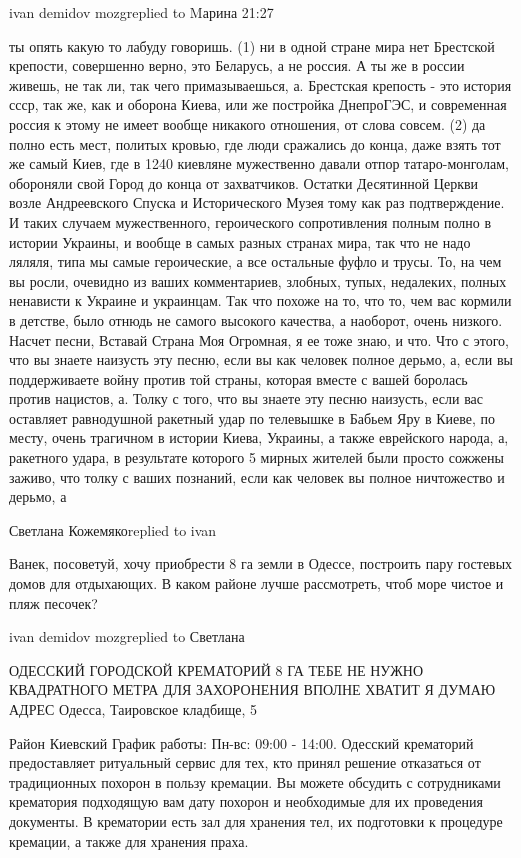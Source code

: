 ivan demidov mozgreplied to Mарина
21:27

ты опять какую то лабуду говоришь. (1) ни в одной стране мира нет Брестской
крепости, совершенно верно, это Беларусь, а не россия. А ты же в россии живешь,
не так ли, так чего примазываешься, а. Брестская крепость - это история ссср,
так же, как и оборона Киева, или же постройка ДнепроГЭС, и современная россия к
этому не имеет вообще никакого отношения, от слова совсем. (2) да полно есть
мест, политых кровью, где люди сражались до конца, даже взять тот же самый
Киев, где в 1240 киевляне мужественно давали отпор татаро-монголам, обороняли
свой Город до конца от захватчиков. Остатки Десятинной Церкви возле
Андреевского Спуска и Исторического Музея тому как раз подтверждение. И таких
случаем мужественного, героического сопротивления полным полно в истории
Украины, и вообще в самых разных странах мира, так что не надо ляляля, типа мы
самые героические, а все остальные фуфло и трусы. То, на чем вы росли, очевидно
из ваших комментариев, злобных, тупых, недалеких, полных ненависти к Украине и
украинцам. Так что похоже на то, что то, чем вас кормили в детстве, было отнюдь
не самого высокого качества, а наоборот, очень низкого. Насчет песни, Вставай
Страна Моя Огромная, я ее тоже знаю, и что. Что с этого, что вы знаете наизусть
эту песню, если вы как человек полное дерьмо, а, если вы поддерживаете войну
против той страны, которая вместе с вашей боролась против нацистов, а. Толку с
того, что вы знаете эту песню наизусть, если вас оставляет равнодушной ракетный
удар по телевышке в Бабьем Яру в Киеве, по месту, очень трагичном в истории
Киева, Украины, а также еврейского народа, а, ракетного удара, в результате
которого 5 мирных жителей были просто сожжены заживо, что толку с ваших
познаний, если как человек вы полное ничтожество и дерьмо, а

Светлана Кожемякоreplied to ivan

Ванек, посоветуй, хочу приобрести 8 га земли в Одессе, построить пару гостевых
домов для отдыхающих. В каком районе лучше рассмотреть, чтоб море чистое и пляж
песочек?

ivan demidov mozgreplied to Светлана

ОДЕССКИЙ ГОРОДСКОЙ КРЕМАТОРИЙ 8 ГА ТЕБЕ НЕ НУЖНО КВАДРАТНОГО МЕТРА ДЛЯ
ЗАХОРОНЕНИЯ ВПОЛНЕ ХВАТИТ Я ДУМАЮ АДРЕС Одесса, Таировское кладбище, 5

Район Киевский	График работы: Пн-вс: 
09:00 - 14:00.
Одесский крематорий предоставляет ритуальный сервис
для тех, кто принял решение отказаться от традиционных похорон в пользу
кремации. Вы можете обсудить с сотрудниками крематория подходящую вам
дату похорон и необходимые для их проведения документы.
В крематории есть зал для хранения тел, их
подготовки к процедуре кремации, а также для хранения праха.

